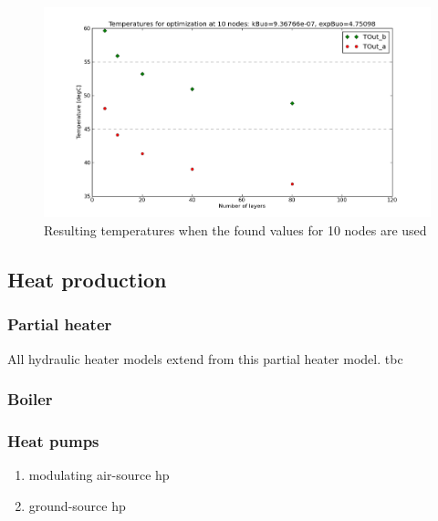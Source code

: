 \begin{figure}%
\includegraphics[width=\columnwidth]{Thermal/images/Validation_Vitocell100V390l_ChargingTimeEndTemperatures_nonlin_10nodes.png}%
\caption{Resulting temperatures when the found values for 10 nodes are used}%
\label{tankinternal}%
\end{figure}


\subsection{Heat production}

\subsubsection{Partial heater}


\vspace{6mm}

All hydraulic heater models extend from this partial heater model.  
tbc

\subsubsection{Boiler}

\subsubsection{Heat pumps}

\begin{enumerate}
	\item modulating air-source hp
	\item ground-source hp
\end{enumerate}

